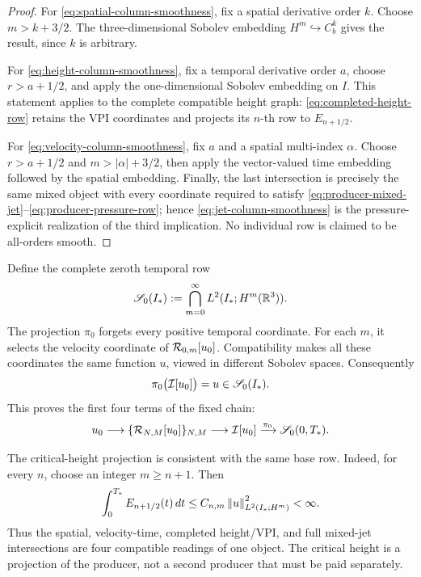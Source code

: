 \begin{proof}
For \eqref{eq:spatial-column-smoothness}, fix a spatial derivative order
\(k\).  Choose \(m>k+3/2\).  The three-dimensional Sobolev embedding
\(H^m\hookrightarrow C_b^k\) gives the result, since \(k\) is arbitrary.

For \eqref{eq:height-column-smoothness}, fix a temporal derivative order
\(a\), choose \(r>a+1/2\), and apply the one-dimensional Sobolev embedding on
\(I\).  This statement applies to the complete compatible height graph:
\eqref{eq:completed-height-row} retains the VPI coordinates and projects its
\(n\)-th row to \(E_{n+1/2}\).

For \eqref{eq:velocity-column-smoothness}, fix \(a\) and a spatial
multi-index \(\alpha\).  Choose \(r>a+1/2\) and
\(m>|\alpha|+3/2\), then apply the vector-valued time embedding followed by
the spatial embedding.  Finally, the last intersection is precisely the same
mixed object with every coordinate required to satisfy
\eqref{eq:producer-mixed-jet}--\eqref{eq:producer-pressure-row}; hence
\eqref{eq:jet-column-smoothness} is the pressure-explicit realization of the
third implication.  No individual row is claimed to be all-orders smooth.
\end{proof}

Define the complete zeroth temporal row
\begin{equation}
 \mathscr S_0(I_*):=\bigcap_{m=0}^{\infty}L^2(I_*;H^m(\mathbb R^3)).
 \label{eq:S0}
\end{equation}
The projection \(\pi_0\) forgets every positive temporal coordinate. For
each \(m\), it selects the velocity coordinate of \(\mathcal R_{0,m}[u_0]\).
Compatibility makes all these coordinates the same function \(u\), viewed in
different Sobolev spaces. Consequently
\begin{equation}
 \pi_0\bigl(\mathcal I[u_0]\bigr)=u\in\mathscr S_0(I_*).
 \label{eq:pi0}
\end{equation}
This proves the first four terms of the fixed chain:
\[
 u_0
 \longrightarrow
 \{\mathcal R_{N,M}[u_0]\}_{N,M}
 \longrightarrow
 \mathcal I[u_0]
 \xrightarrow{\pi_0}
 \mathscr S_0(0,T_*).
\]

The critical-height projection is consistent with the same base row.  Indeed,
for every \(n\), choose an integer \(m\geq n+1\).  Then
\begin{equation}
 \int_0^{T_*}E_{n+1/2}(t)\,dt
 \leq C_{n,m}\left\lVert u\right\rVert_{L^2(I_*;H^m)}^2<\infty.
 \label{eq:all-height-rows-L1}
\end{equation}
Thus the spatial, velocity-time, completed height/VPI, and full mixed-jet
intersections are four compatible readings of one object.  The critical
height is a projection of the producer, not a second producer that must be
paid separately.
